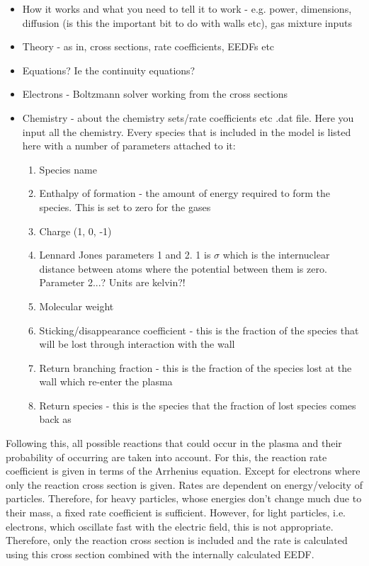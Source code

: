 \documentclass[11pt, oneside]{article}   	%
\begin{document}
\begin{itemize}
\item How it works and what you need to tell it to work - e.g. power, dimensions, diffusion (is this the important bit to do with walls etc), gas mixture inputs
\item Theory - as in, cross sections, rate coefficients, EEDFs etc
\item Equations? Ie the continuity equations?
\item Electrons - Boltzmann solver working from the cross sections
\item Chemistry - about the chemistry sets/rate coefficients etc
.dat file. Here you input all the chemistry. Every species that is included in the model is listed here with a number of parameters attached to it:
\begin{enumerate}
\item Species name
\item Enthalpy of formation - the amount of energy required to form the species. This is set to zero for the gases
\item Charge (1, 0, -1)
\item Lennard Jones parameters 1 and 2. 1 is $\sigma$ which is the internuclear distance between atoms where the potential between them is zero. Parameter 2...? Units are kelvin?!
\item Molecular weight
\item Sticking/disappearance coefficient - this is the fraction of the species that will be lost through interaction with the wall
\item Return branching fraction - this is the fraction of the species lost at the wall which re-enter the plasma
\item Return species - this is the species that the fraction of lost species comes back as
\end{enumerate}
\end{itemize}
Following this, all possible reactions that could occur in the plasma and their probability of occurring are taken into account. 
For this, the reaction rate coefficient is given in terms of the Arrhenius equation. 
Except for electrons where only the reaction cross section is given. 
Rates are dependent on energy/velocity of particles. 
Therefore, for heavy particles, whose energies don't change much due to their mass, a fixed rate coefficient is sufficient. 
However, for light particles, i.e. electrons, which oscillate fast with the electric field, this is not appropriate.
Therefore, only the reaction cross section is included and the rate is calculated using this cross section combined with the internally calculated EEDF.
\end{document}
